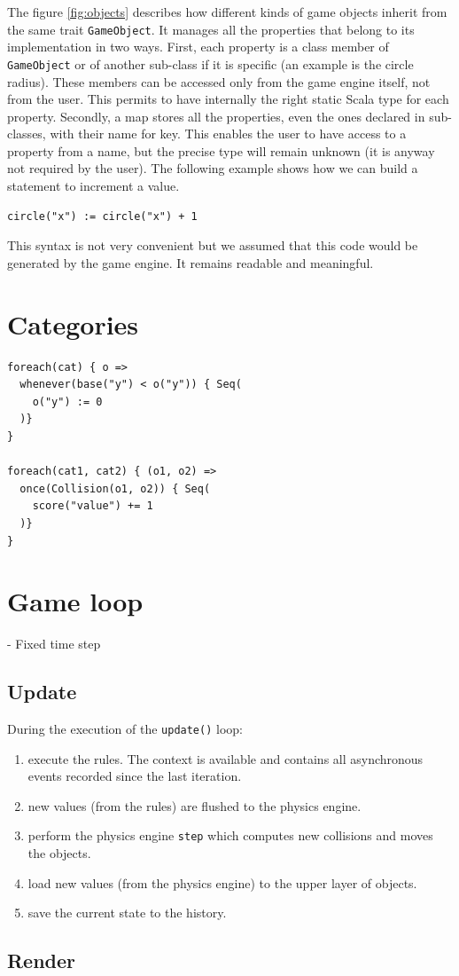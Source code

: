 \documentclass[11pt,a4paper]{article}
\begin{document}
The figure \ref{fig:objects} describes how different kinds of game objects inherit from the same trait \texttt{GameObject}. It manages all the properties that belong to its implementation in two ways. First, each property is a class member of \texttt{GameObject} or of another sub-class if it is specific (an example is the circle radius). These members can be accessed only from the game engine itself, not from the user. This permits to have internally the right static Scala type for each property. Secondly, a map stores all the properties, even the ones declared in sub-classes, with their name for key. This enables the user to have access to a property from a name, but the precise type will remain unknown (it is anyway not required by the user). The following example shows how we can build a statement to increment a value.

\begin{lstlisting}
circle("x") := circle("x") + 1
\end{lstlisting}

This syntax is not very convenient but we assumed that this code would be generated by the game engine. It remains readable and meaningful.


\section{Categories}

\begin{lstlisting}
foreach(cat) { o =>
  whenever(base("y") < o("y")) { Seq(
    o("y") := 0
  )}
}

foreach(cat1, cat2) { (o1, o2) =>
  once(Collision(o1, o2)) { Seq(
    score("value") += 1
  )}  
}
\end{lstlisting}

\section{Game loop}

- Fixed time step

\subsection{Update}

During the execution of the \texttt{update()} loop:
\begin{enumerate}
\item execute the rules. The context is available and contains all asynchronous events recorded since the last iteration.
\item new values (from the rules) are flushed to the physics engine.
\item perform the physics engine \texttt{step} which computes new collisions and moves the objects.
\item load new values (from the physics engine) to the upper layer of objects.
\item save the current state to the history.
\end{enumerate}

\subsection{Render}
\end{document}
